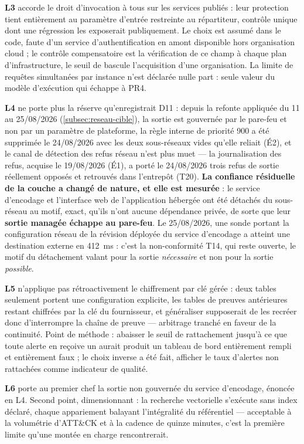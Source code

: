 \textbf{L3} accorde le droit d'invocation à tous sur les services publiés : leur protection tient
entièrement au paramètre d'entrée restreinte au répartiteur, contrôle unique dont une régression les
exposerait publiquement. Le choix est assumé dans le code, faute d'un service d'authentification en
amont disponible hors organisation cloud ; le contrôle compensatoire est la vérification de ce champ
à chaque plan d'infrastructure, le seuil de bascule l'acquisition d'une organisation. La limite de
requêtes simultanées par instance n'est déclarée nulle part : seule valeur du modèle d'exécution qui
échappe à PR4.

\textbf{L4} ne porte plus la réserve qu'enregistrait D11 : depuis la refonte appliquée du 11 au
25/08/2026 (\cref{subsec:reseau-cible}), la sortie est gouvernée par le pare-feu et non par un
paramètre de plateforme, la règle interne de priorité 900 a été supprimée le 24/08/2026 avec les
deux sous-réseaux vides qu'elle reliait (É2), et le canal de détection des refus réseau n'est plus
muet --- la journalisation des refus, acquise le 19/08/2026 (É1), a porté le 24/08/2026 trois refus
de sortie réellement opposés et retrouvés dans l'entrepôt (T20). \textbf{La confiance résiduelle de
la couche a changé de nature, et elle est mesurée} : le service d'encodage et l'interface web de
l'application hébergée ont été détachés du sous-réseau au motif, exact, qu'ils n'ont aucune
dépendance privée, de sorte que leur \textbf{sortie managée échappe au pare-feu}. Le 25/08/2026, une
sonde portant la configuration réseau de la révision déployée du service d'encodage a atteint une
destination externe en 412~ms : c'est la non-conformité T14, qui reste ouverte, le motif du
détachement valant pour la sortie \emph{nécessaire} et non pour la sortie \emph{possible}.

\textbf{L5} n'applique pas rétroactivement le chiffrement par clé gérée : deux tables seulement
portent une configuration explicite, les tables de preuves antérieures restant chiffrées par la clé
du fournisseur, et généraliser supposerait de les recréer donc d'interrompre la chaîne de preuve ---
arbitrage tranché en faveur de la continuité. Point de méthode : abaisser le seuil de rattachement
jusqu'à ce que toute alerte en reçoive un aurait produit un tableau de bord entièrement rempli et
entièrement faux ; le choix inverse a été fait, afficher le taux d'alertes non rattachées comme
indicateur de qualité.

\textbf{L6} porte au premier chef la sortie non gouvernée du service d'encodage, énoncée en L4.
Second point, dimensionnant : la recherche vectorielle s'exécute sans index déclaré, chaque
appariement balayant l'intégralité du référentiel --- acceptable à la volumétrie d'ATT\&CK et à la
cadence de quinze minutes, c'est la première limite qu'une montée en charge rencontrerait.

